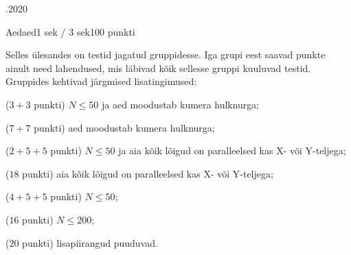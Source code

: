 \documentclass[a4paper,11pt]{article}
\begin{document}
\begin{ol}{\eio}{.2020}{\yle}{}
\begin{yl}{1}{Aed}{aed}{1 sek / 3 sek}{100 punkti}
\nde[0]{3cm}{3cm}

\nde[1]{3cm}{3cm}

\nde[2]{3cm}{3cm}

\hnd Selles ülesandes on testid jagatud gruppidesse. Iga grupi eest saavad punkte ainult need lahendused, mis läbivad kõik sellesse gruppi kuuluvad testid. Gruppides kehtivad järgmised lisatingimused:
\begin{xitem}
  \item ($3 + 3$ punkti) $N \le 50$ ja aed moodustab kumera hulknurga;
  \item ($7 + 7$ punkti) aed moodustab kumera hulknurga;
  \item ($2 + 5 + 5$ punkti) $N \le 50$ ja aia kõik lõigud on paralleelsed kas X- või Y-teljega;
  \item ($18$ punkti) aia kõik lõigud on paralleelsed kas X- või Y-teljega;
  \item ($4 + 5 + 5$ punkti) $N \le 50$;
  \item ($16$ punkti) $N \le 200$;
  \item ($20$ punkti) lisapiirangud puuduvad.
\end{xitem}

\end{yl}
\end{ol}
\end{document}
